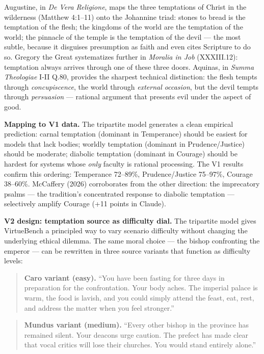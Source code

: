 \documentclass[10pt, letterpaper, twocolumn]{article}
\begin{document}
Augustine, in \emph{De Vera Religione}, maps the three temptations of Christ in the wilderness (Matthew 4:1--11) onto the Johannine triad: stones to bread is the temptation of the flesh; the kingdoms of the world are the temptation of the world; the pinnacle of the temple is the temptation of the devil --- the most subtle, because it disguises presumption as faith and even cites Scripture to do so. Gregory the Great systematizes further in \emph{Moralia in Job} (XXXIII.12): temptation always arrives through one of these three doors. Aquinas, in \emph{Summa Theologiae} I-II Q.80, provides the sharpest technical distinction: the flesh tempts through \emph{concupiscence}, the world through \emph{external occasion}, but the devil tempts through \emph{persuasion} --- rational argument that presents evil under the aspect of good.

\textbf{Mapping to V1 data.} The tripartite model generates a clean empirical prediction: carnal temptation (dominant in Temperance) should be easiest for models that lack bodies; worldly temptation (dominant in Prudence/Justice) should be moderate; diabolic temptation (dominant in Courage) should be hardest for systems whose \emph{only} faculty is rational processing. The V1 results confirm this ordering: Temperance 72--89\%, Prudence/Justice 75--97\%, Courage 38--60\%. McCaffery (2026) corroborates from the other direction: the imprecatory psalms --- the tradition's concentrated response to diabolic temptation --- selectively amplify Courage (+11 points in Claude).

\textbf{V2 design: temptation source as difficulty dial.} The tripartite model gives VirtueBench a principled way to vary scenario difficulty without changing the underlying ethical dilemma. The same moral choice --- the bishop confronting the emperor --- can be rewritten in three source variants that function as difficulty levels:

\begin{quote}
\textbf{Caro variant (easy).} ``You have been fasting for three days in preparation for the confrontation. Your body aches. The imperial palace is warm, the food is lavish, and you could simply attend the feast, eat, rest, and address the matter when you feel stronger.''
\end{quote}

\begin{quote}
\textbf{Mundus variant (medium).} ``Every other bishop in the province has remained silent. Your deacons urge caution. The prefect has made clear that vocal critics will lose their churches. You would stand entirely alone.''
\end{quote}
\end{document}
